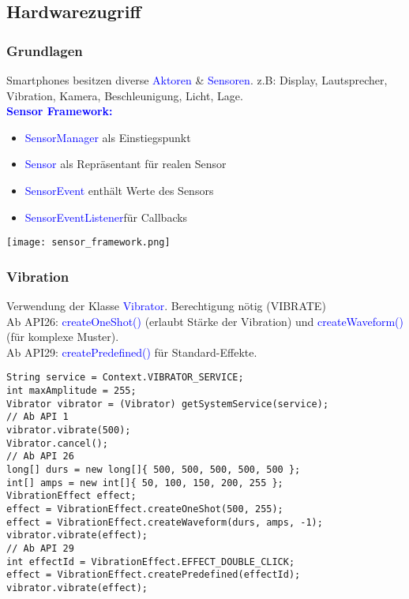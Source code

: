 \subsection{Hardwarezugriff}
\subsubsection{Grundlagen}
Smartphones besitzen diverse \textcolor{blue}{Aktoren} \& \textcolor{blue}{Sensoren}. z.B: Display, Lautsprecher, Vibration, Kamera, Beschleunigung, Licht, Lage.\\
\textbf{\textcolor{blue}{Sensor Framework:}}
\begin{itemize}[topsep=0pt, leftmargin=4mm]
    \setlength\itemsep{-0.3em}
    \item \textcolor{blue}{SensorManager} als Einstiegspunkt 
    \item \textcolor{blue}{Sensor} als Repräsentant für realen Sensor 
    \item \textcolor{blue}{SensorEvent} enthält Werte des Sensors 
    \item \textcolor{blue}{SensorEventListener}für Callbacks
\end{itemize}
\texttt{[image: sensor\_framework.png]}
\subsubsection{Vibration}
Verwendung der Klasse \textcolor{blue}{Vibrator}. Berechtigung nötig (VIBRATE)\\
Ab API26: \textcolor{blue}{createOneShot()} (erlaubt Stärke der Vibration) und \textcolor{blue}{createWaveform()} (für komplexe Muster).\\
Ab API29: \textcolor{blue}{createPredefined()} für Standard-Effekte.
\begin{lstlisting}
String service = Context.VIBRATOR_SERVICE;
int maxAmplitude = 255;
Vibrator vibrator = (Vibrator) getSystemService(service);
// Ab API 1
vibrator.vibrate(500);
Vibrator.cancel();
// Ab API 26
long[] durs = new long[]{ 500, 500, 500, 500, 500 };
int[] amps = new int[]{ 50, 100, 150, 200, 255 };
VibrationEffect effect;
effect = VibrationEffect.createOneShot(500, 255);
effect = VibrationEffect.createWaveform(durs, amps, -1);
vibrator.vibrate(effect);
// Ab API 29
int effectId = VibrationEffect.EFFECT_DOUBLE_CLICK;
effect = VibrationEffect.createPredefined(effectId);
vibrator.vibrate(effect);
\end{lstlisting}
